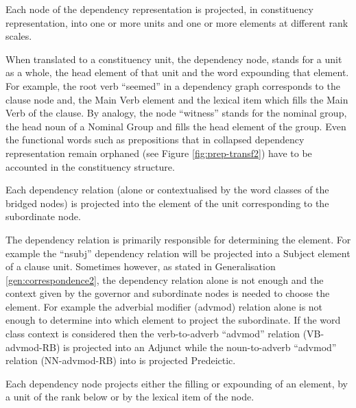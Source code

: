 \begin{generalization}\label{gen:correspondence1} %
 Each node of the dependency representation is projected, in constituency representation, into one or more units and one or more elements at different rank scales.
\end{generalization}

When translated to a constituency unit, the dependency node, stands for a unit as a whole, the head element of that unit and the word expounding that element. 
For example, the root verb ``seemed'' in a dependency graph corresponds to the clause node and, the Main Verb element and the lexical item which fills the Main Verb of the clause. By analogy, the node ``witness'' stands for the nominal group, the head noun of a Nominal Group and fills the head element of the group.
Even the functional words such as prepositions that in collapsed dependency representation remain orphaned (see Figure \ref{fig:prep-transf2}) have to be accounted in the constituency structure. 

\begin{generalization}\label{gen:correspondence2}
    Each dependency relation (alone or contextualised by the word classes of the bridged nodes) is projected into the element of the unit corresponding to the subordinate node. 
\end{generalization}

The dependency relation is primarily responsible for determining the element. For example the ``nsubj'' dependency relation will be projected into a Subject element of a clause unit. Sometimes however, as stated in Generalisation \ref{gen:correspondence2}, the dependency relation alone is not enough and the context given by the governor and subordinate nodes is needed to choose the element. For example the adverbial modifier (advmod) relation alone is not enough to determine into which element to project the subordinate. If the word class context is considered then the verb-to-adverb ``advmod'' relation (VB-advmod-RB) is projected into an Adjunct while the noun-to-adverb ``advmod'' relation (NN-advmod-RB) into is projected Predeictic.  

\begin{generalization}\label{gen:correspondence3}
    Each dependency node projects either the filling or expounding of an element, by a unit of the rank below or by the lexical item of the node. 
\end{generalization}

